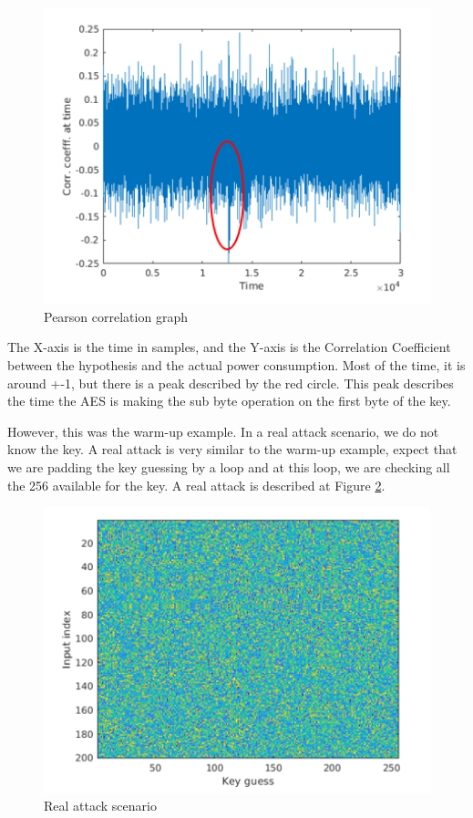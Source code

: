 \begin{figure}[!ht]
    \centering
    \includegraphics[width=1.0\textwidth]{images/chapter8/pearson_correlation_numbers.png}
    \caption{Pearson correlation graph} \label{c8_Matlab_pearson_correlation:fig}
\end{figure}

The X-axis is the time in samples, and the Y-axis is the Correlation Coefficient
between the hypothesis and the actual power consumption. Most of the time, it is
around +-1, but there is a peak described by the red circle. This peak describes
the time the AES is making the sub byte operation on the first byte of
the key. 

However, this was the warm-up example. In a real attack scenario, we do not know
the key. A real attack is very similar to the warm-up example, expect that we
are padding the key guessing by a loop and at this loop, we are checking all the
256 available for the key. A real attack is described at Figure
\ref{c8_Matlab_real_attack_scenario:fig}.

\begin{figure}[!ht]
    \centering
    \includegraphics[width=1.0\textwidth]{images/chapter8/real_attack_scenario.png}
    \caption{Real attack scenario} \label{c8_Matlab_real_attack_scenario:fig}
\end{figure}

